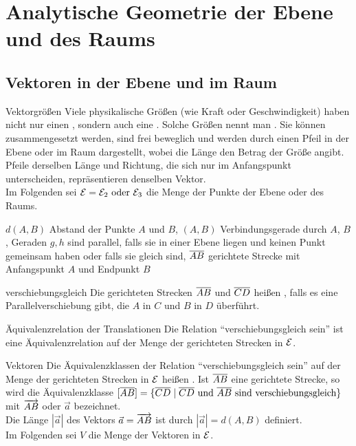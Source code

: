 \chapter{%
    Analytische Geometrie der Ebene und des Raums%
}

\section{%
    Vektoren in der Ebene und im Raum%
}

\begin{Def}{Vektorgrößen}
    Viele physikalische Größen (wie Kraft oder Geschwindigkeit) haben nicht nur
    einen , sondern auch eine .
    Solche Größen nennt man .
    Sie können zusammengesetzt werden, sind frei beweglich und werden durch
    einen Pfeil in der Ebene oder im Raum dargestellt, wobei die Länge
    den Betrag der Größe angibt.
    Pfeile derselben Länge und Richtung, die sich nur im Anfangspunkt
    unterscheiden, repräsentieren denselben Vektor. \\
    Im Folgenden sei $\mathcal{E} = \mathcal{E}_2 \text{ oder } \mathcal{E}_3$
    die Menge der Punkte der Ebene oder des Raums.
\end{Def}

\begin{Notation}
    $d(A, B)$ Abstand der Punkte $A$ und $B$, \qquad
    $(A, B)$ Verbindungsgerade durch $A$, $B$, \qquad
    Geraden $g, h$ sind parallel, falls sie in einer Ebene liegen und keinen
    Punkt gemeinsam haben oder falls sie gleich sind, \qquad
    $\overline{AB}$ gerichtete Strecke mit Anfangspunkt $A$ und Endpunkt $B$
\end{Notation}

\begin{Def}{verschiebungsgleich}
    Die gerichteten Strecken $\overline{AB}$ und $\overline{CD}$ heißen
    , falls es eine Parallelverschiebung gibt,
    die $A$ in $C$ und $B$ in $D$ überführt.
\end{Def}

\begin{Lemma}{Äquivalenzrelation der Translationen}
    Die Relation "`verschiebungsgleich sein"' ist eine Äquivalenzrelation
    auf der Menge der gerichteten Strecken in $\mathcal{E}$.
\end{Lemma}

\begin{Def}{Vektoren}
    Die Äquivalenzklassen der Relation "`verschiebungsgleich sein"'
    auf der Menge der gerichteten Strecken in $\mathcal{E}$ heißen
    .
    Ist $\overline{AB}$ eine gerichtete Strecke, so wird die Äquivalenzklasse
    $[\overline{AB}] = \{\overline{CD} \;|\; \overline{CD} \text{ und }
    \overline{ AB } \text{ sind verschiebungsgleich}\}$ mit $\overrightarrow{AB}$
    oder $\vec{a}$ bezeichnet. \\
    Die Länge $|\vec{a}|$ des Vektors $\vec{a} = \overrightarrow{AB}$ ist durch
    $|\vec{a}| = d(A, B)$ definiert. \\
    Im Folgenden sei $V$ die Menge der Vektoren in $\mathcal{E}$.
\end{Def}


